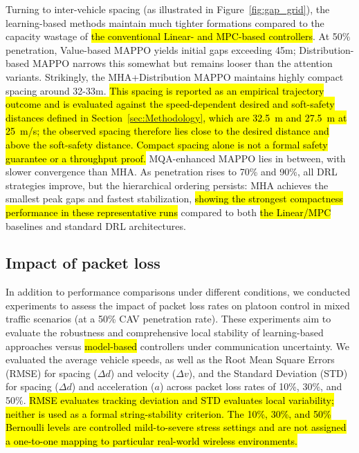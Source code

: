 \documentclass{ieeeaccess}
\begin{document}
Turning to inter-vehicle spacing (as illustrated in Figure~\ref{fig:gap_grid}), the learning-based methods maintain much tighter formations compared to the capacity wastage of \hl{the conventional Linear- and MPC-based controllers}. At 50\% penetration, Value-based MAPPO yields initial gaps exceeding 45m; Distribution-based MAPPO narrows this somewhat but remains looser than the attention variants. Strikingly, the MHA+Distribution MAPPO maintains highly compact spacing around 32-33m. \hl{This spacing is reported as an empirical trajectory outcome and is evaluated against the speed-dependent desired and soft-safety distances defined in Section~\ref{sec:Methodology}, which are 32.5~m and 27.5~m at 25~m/s; the observed spacing therefore lies close to the desired distance and above the soft-safety distance. Compact spacing alone is not a formal safety guarantee or a throughput proof.} MQA-enhanced MAPPO lies in between, with slower convergence than MHA. As penetration rises to 70\% and 90\%, all DRL strategies improve, but the hierarchical ordering persists: MHA achieves the smallest peak gaps and fastest stabilization, \hl{showing the strongest compactness performance in these representative runs} compared to both \hl{the Linear/MPC} baselines and standard DRL architectures.


\subsection{Impact of packet loss}
\label{sec:impact_packet_loss}

In addition to performance comparisons under different conditions, we conducted experiments to assess the impact of packet loss rates on platoon control in mixed traffic scenarios (at a 50\% CAV penetration rate). These experiments aim to evaluate the robustness and comprehensive local stability of learning-based approaches versus \hl{model-based} controllers under communication uncertainty. We evaluated the average vehicle speeds, as well as the Root Mean Square Errors (RMSE) for spacing ($\Delta d$) and velocity ($\Delta v$),  and the Standard Deviation (STD) for spacing ($\Delta d$) and acceleration ($a$) across packet loss rates of 10\%, 30\%, and 50\%. \hl{RMSE evaluates tracking deviation and STD evaluates local variability; neither is used as a formal string-stability criterion. The 10\%, 30\%, and 50\% Bernoulli levels are controlled mild-to-severe stress settings and are not assigned a one-to-one mapping to particular real-world wireless environments.}
\end{document}

